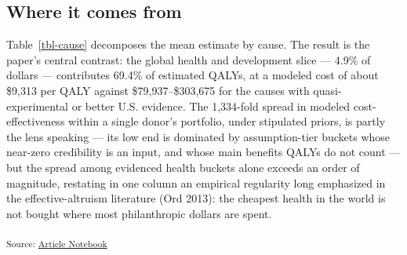 \documentclass[
  11pt,
  letterpaper,
  DIV=11,
  numbers=noendperiod]{scrartcl}
\begin{document}
\subsection{Where it comes from}\label{where-it-comes-from}

Table~\ref{tbl-cause} decomposes the mean estimate by cause. The result
is the paper's central contrast: the global health and development slice
--- 4.9\% of dollars --- contributes 69.4\% of estimated QALYs, at a
modeled cost of about \$9,313 per QALY against \$79,937--\$303,675 for
the causes with quasi-experimental or better U.S. evidence. The
1,334-fold spread in modeled cost-effectiveness within a single donor's
portfolio, under stipulated priors, is partly the lens speaking --- its
low end is dominated by assumption-tier buckets whose near-zero
credibility is an input, and whose main benefits QALYs do not count ---
but the spread among evidenced health buckets alone exceeds an order of
magnitude, restating in one column an empirical regularity long
emphasized in the effective-altruism literature (Ord 2013): the cheapest
health in the world is not bought where most philanthropic dollars are
spent.

\textsubscript{Source:
\href{https://MaxGhenis.github.io/mackenzie-scott-qaly/index.qmd.html}{Article
Notebook}}
\end{document}
